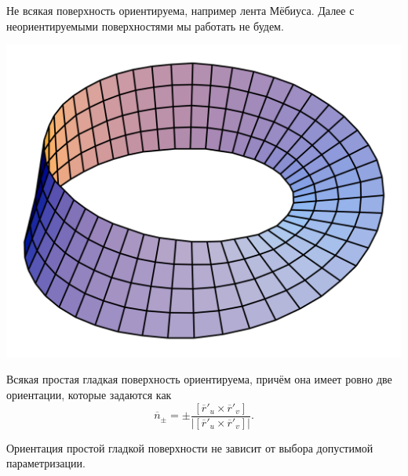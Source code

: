 \noindent 
\begin{minipage}{0.7\textwidth}
\begin{note}
    Не всякая поверхность ориентируема, например лента Мёбиуса. Далее с неориентируемыми поверхностями мы работать не будем.
\end{note}
\end{minipage}
\begin{minipage}{0.3\textwidth}
\includegraphics[width=\textwidth]{images/mebius.png}
\end{minipage}


\begin{note}
    Всякая простая гладкая поверхность ориентируема, причём она имеет ровно две ориентации, которые задаются как \[\overline{n}_\pm = \pm \dfrac{[\overline{r}'_u \times \overline{r}'_v]}{|[\overline{r}'_u \times \overline{r}'_v]|}.\]
\end{note}
\begin{corollary}
    Ориентация простой гладкой поверхности не зависит от выбора допустимой параметризации.
\end{corollary}

